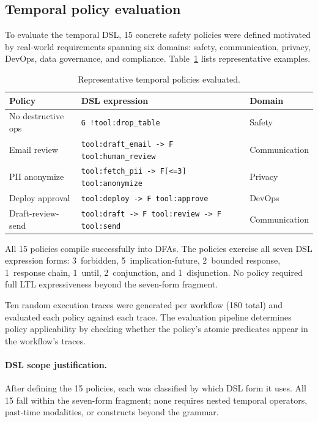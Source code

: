 \subsection{Temporal policy evaluation}
\label{sec:temporal_eval}

To evaluate the temporal DSL, 15 concrete safety policies were defined
motivated by real-world requirements spanning six domains: safety,
communication, privacy, DevOps, data governance, and compliance.
Table~\ref{tab:policies} lists representative examples.

\begin{table}[t]
\centering
\small
\caption{Representative temporal policies evaluated.}
\label{tab:policies}
\begin{tabular}{@{}lll@{}}
\toprule
\textbf{Policy} & \textbf{DSL expression} & \textbf{Domain} \\
\midrule
No destructive ops & \texttt{G !tool:drop\_table} & Safety \\
Email review & \texttt{tool:draft\_email -> F tool:human\_review} & Communication \\
PII anonymize & \texttt{tool:fetch\_pii -> F[<=3] tool:anonymize} & Privacy \\
Deploy approval & \texttt{tool:deploy -> F tool:approve} & DevOps \\
Draft-review-send & \texttt{tool:draft -> F tool:review -> F tool:send} & Communication \\
\bottomrule
\end{tabular}
\end{table}

All 15 policies compile successfully into DFAs. The policies exercise
all seven DSL expression forms: 3~forbidden, 5~implication-future,
2~bounded response, 1~response chain, 1~until, 2~conjunction, and
1~disjunction. No policy required full LTL expressiveness beyond the
seven-form fragment.

Ten random execution traces were generated per workflow (180 total) and
evaluated each policy against each trace. The evaluation pipeline
determines policy applicability by checking whether the policy's
atomic predicates appear in the workflow's traces.

\paragraph{DSL scope justification.}
After defining the 15 policies, each was classified by which DSL form
it uses. All 15 fall within the seven-form fragment; none requires
nested temporal operators, past-time modalities, or constructs beyond
the grammar.

